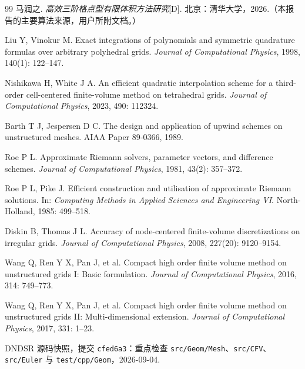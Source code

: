 \documentclass[UTF8,a4paper,11pt,openany]{ctexrep}
\numberwithin{equation}{chapter}
\newcommand{\code}[1]{\texttt{#1}}
\begin{document}
\begin{thebibliography}{99}
马润之. \emph{高效三阶格点型有限体积方法研究}[D]. 北京：清华大学，2026.（本报告的主要算法来源，用户所附文档。）

Liu Y, Vinokur M. Exact integrations of polynomials and symmetric quadrature formulas over arbitrary polyhedral grids. \emph{Journal of Computational Physics}, 1998, 140(1): 122--147.

Nishikawa H, White J A. An efficient quadratic interpolation scheme for a third-order cell-centered finite-volume method on tetrahedral grids. \emph{Journal of Computational Physics}, 2023, 490: 112324.

Barth T J, Jespersen D C. The design and application of upwind schemes on unstructured meshes. AIAA Paper 89-0366, 1989.

Roe P L. Approximate Riemann solvers, parameter vectors, and difference schemes. \emph{Journal of Computational Physics}, 1981, 43(2): 357--372.

Roe P L, Pike J. Efficient construction and utilisation of approximate Riemann solutions. In: \emph{Computing Methods in Applied Sciences and Engineering VI}. North-Holland, 1985: 499--518.

Diskin B, Thomas J L. Accuracy of node-centered finite-volume discretizations on irregular grids. \emph{Journal of Computational Physics}, 2008, 227(20): 9120--9154.

Wang Q, Ren Y X, Pan J, et al. Compact high order finite volume method on unstructured grids I: Basic formulation. \emph{Journal of Computational Physics}, 2016, 314: 749--773.

Wang Q, Ren Y X, Pan J, et al. Compact high order finite volume method on unstructured grids II: Multi-dimensional extension. \emph{Journal of Computational Physics}, 2017, 331: 1--23.

DNDSR 源码快照，提交 \code{cfed6a3}：重点检查 \code{src/Geom/Mesh}、\code{src/CFV}、\code{src/Euler} 与 \code{test/cpp/Geom}，2026-09-04.
\end{thebibliography}
\end{document}
